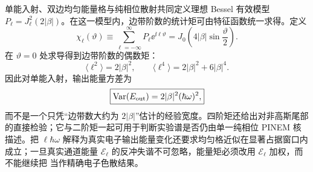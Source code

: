 单能入射、双边均匀能量格与纯相位散射共同定义理想 Bessel 有效模型 $P_\ell=J_\ell^2(2|\beta|)$。在这一模型内，边带阶数的统计矩可由特征函数统一求得。定义
\begin{equation}
\boxed{
\chi_\ell(\vartheta)
\equiv\sum_{\ell=-\infty}^{\infty}P_\ell \ee^{\ii\ell\vartheta}
=J_0\!\left(4|\beta|\sin\frac{\vartheta}{2}\right).}
\label{eq:pinem-sideband-characteristic-dp83}
\end{equation}
在 $\vartheta=0$ 处求导得到边带阶数的偶数矩：
\begin{equation}
\boxed{
\langle \ell^2\rangle=2|\beta|^2,
\qquad
\langle \ell^4\rangle=2|\beta|^2+6|\beta|^4.}
\label{eq:pinem-sideband-moments-dp83}
\end{equation}
因此对单能入射，输出能量方差为
\begin{equation}
\boxed{
\operatorname{Var}(E_{\rm out})
=2|\beta|^2(\hbar\omega)^2,}
\label{eq:pinem-energy-variance-dp83}
\end{equation}
而不是一个只凭“边带数大约为 $2|\beta|$”估计的经验宽度。四阶矩还给出对非高斯尾部的直接检验；它与二阶矩一起可用于判断实验谱是否仍由单一纯相位 PINEM 核描述。把 $\ell\hbar\omega$ 解释为真实电子输出能量变化还要求均匀格近似在显著占据窗口内成立；一旦真实通道能量 $\mathcal E_\ell$ 的反冲失谐不可忽略，能量矩必须改用 $\mathcal E_\ell$ 加权，而不能继续把 当作精确电子色散结果。

